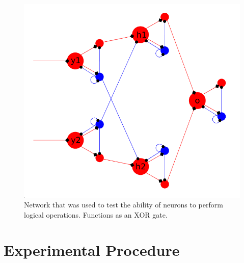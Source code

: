 \documentclass[10pt,a4paper]{article}
\begin{document}
\begin{figure}
    \centering
    \includegraphics[width=\textwidth]{figures/XOR-used.png}
    \caption{Network that was used to test the ability of neurons to perform
        logical operations. Functions as an XOR gate.}
    \label{fig:XOR-used}
\end{figure}

\section{Experimental Procedure}
\end{document}
